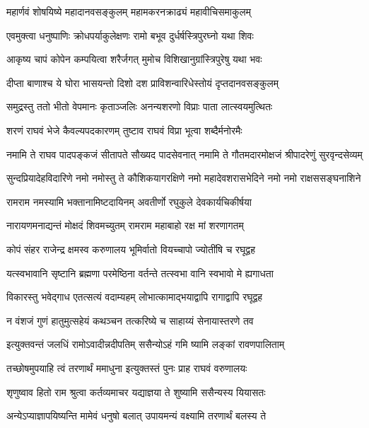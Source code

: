 \twolineshloka
{महार्णवं शोषयिष्ये महादानवसङ्कुलम्}
{महामकरनक्राढ्यं महावीचिसमाकुलम्}%

\twolineshloka
{एवमुक्त्वा धनुष्पाणिः क्रोधपर्याकुलेक्षणः}
{रामो बभूव दुर्धर्षस्त्रिपुरघ्नो यथा शिवः}%

\twolineshloka
{आकृष्य चापं कोपेन कम्पयित्वा शरैर्जगत्}
{मुमोच विशिखानुग्रांस्त्रिपुरेषु यथा भवः}%

\twolineshloka
{दीप्ता बाणाश्च ये घोरा भासयन्तो दिशो दश}
{प्राविशन्वारिधेस्तोयं दृप्तदानवसङ्कुलम्}%

\twolineshloka
{समुद्रस्तु ततो भीतो वेपमानः कृताञ्जलिः}
{अनन्यशरणो विप्राः पाता लात्स्वयमुत्थितः}%

\twolineshloka
{शरणं राघवं भेजे कैवल्यपदकारणम्}
{तुष्टाव राघवं विप्रा भूत्वा शब्दैर्मनोरमैः}%


\twolineshloka
{नमामि ते राघव पादपङ्कजं सीतापते सौख्यद पादसेवनात्}
{नमामि ते गौतमदारमोक्षजं श्रीपादरेणुं सुरवृन्दसेव्यम्}%

\twolineshloka
{सुन्दप्रियादेहविदारिणे नमो नमोस्तु ते कौशिकयागरक्षिणे}
{नमो महादेवशरासभेदिने नमो नमो राक्षससङ्घनाशिने}%

\twolineshloka
{रामराम नमस्यामि भक्तानामिष्टदायिनम्}
{अवतीर्णो रघुकुले देवकार्यचिकीर्षया}%

\twolineshloka
{नारायणमनाद्यन्तं मोक्षदं शिवमच्युतम्}
{रामराम महाबाहो रक्ष मां शरणागतम्}%

\twolineshloka
{कोपं संहर राजेन्द्र क्षमस्व करुणालय}
{भूमिर्वातो वियच्चापो ज्योतींषि च रघूद्वह}%

\twolineshloka
{यत्स्वभावानि सृष्टानि ब्रह्मणा परमेष्ठिना}
{वर्तन्ते तत्स्वभा वानि स्वभावो मे ह्यगाधता}%

\twolineshloka
{विकारस्तु भवेद्गाध एतत्सत्यं वदाम्यहम्}
{लोभात्कामाद्भयाद्वापि रागाद्वापि रघूद्वह}%

\twolineshloka
{न वंशजं गुणं हातुमुत्सहेयं कथञ्चन}
{तत्करिष्ये च साहाय्यं सेनायास्तरणे तव}%

\twolineshloka
{इत्युक्तवन्तं जलधिं रामोऽवादीन्नदीपतिम्}
{ससैन्योऽहं गमि ष्यामि लङ्कां रावणपालिताम्}%

\twolineshloka
{तच्छोषमुपयाहि त्वं तरणार्थं ममाधुना}
{इत्युक्तस्तं पुनः प्राह राघवं वरुणालयः}%

\twolineshloka
{शृणुष्वाव हितो राम श्रुत्वा कर्तव्यमाचर}
{यद्याज्ञया ते शुष्यामि ससैन्यस्य यियासतः}%

\twolineshloka
{अन्येऽप्याज्ञापयिष्यन्ति मामेवं धनुषो बलात्}
{उपायमन्यं वक्ष्यामि तरणार्थं बलस्य ते}%

